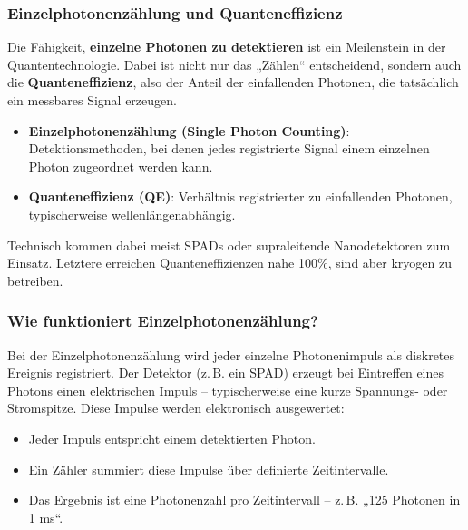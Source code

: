 \subsubsection{Einzelphotonenzählung und Quanteneffizienz}

Die Fähigkeit, \textbf{einzelne Photonen zu detektieren} ist ein Meilenstein in der Quantentechnologie. Dabei ist nicht nur das „Zählen“ entscheidend, sondern auch die \textbf{Quanteneffizienz}, also der Anteil der einfallenden Photonen, die tatsächlich ein messbares Signal erzeugen.
\vspace{1em}
\begin{tcolorbox}[physikbox, title=Physikalische Begriffe]
	\label{box:begriffe}
	\small
	\begin{itemize}
		\item \textbf{Einzelphotonenzählung (Single Photon Counting)}: Detektionsmethoden, bei denen jedes registrierte Signal einem einzelnen Photon zugeordnet werden kann.
		\item \textbf{Quanteneffizienz (QE)}: Verhältnis registrierter zu einfallenden Photonen, typischerweise wellenlängenabhängig.
	\end{itemize}
\end{tcolorbox}

Technisch kommen dabei meist SPADs oder supraleitende Nanodetektoren zum Einsatz. Letztere erreichen Quanteneffizienzen nahe 100\%, sind aber kryogen zu betreiben.
\newpage
\noindent
\subsubsection*{Wie funktioniert Einzelphotonenzählung?}
Bei der Einzelphotonenzählung wird jeder einzelne Photonenimpuls als diskretes Ereignis registriert. Der Detektor (z.\,B. ein SPAD) erzeugt bei Eintreffen eines Photons einen elektrischen Impuls – typischerweise eine kurze Spannungs- oder Stromspitze. Diese Impulse werden elektronisch ausgewertet:

\begin{itemize}
	\item Jeder Impuls entspricht einem detektierten Photon.
	\item Ein Zähler summiert diese Impulse über definierte Zeitintervalle.
	\item Das Ergebnis ist eine Photonenzahl pro Zeitintervall – z.\,B. „125 Photonen in 1 ms“.
\end{itemize}

